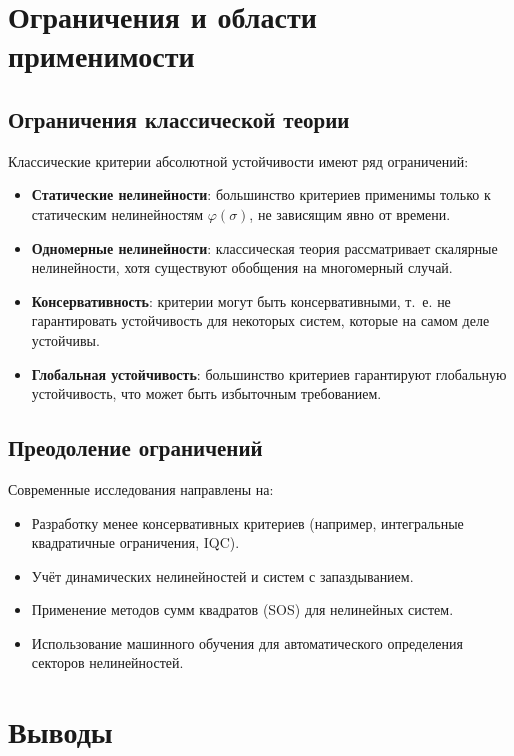 \chapter{Ограничения и области применимости}

\section{Ограничения классической теории}

Классические критерии абсолютной устойчивости имеют ряд ограничений:
\begin{itemize}
    \item \textbf{Статические нелинейности}: большинство критериев применимы только к статическим нелинейностям $\varphi(\sigma)$, не зависящим явно от времени.
    \item \textbf{Одномерные нелинейности}: классическая теория рассматривает скалярные нелинейности, хотя существуют обобщения на многомерный случай.
    \item \textbf{Консервативность}: критерии могут быть консервативными, т.~е. не гарантировать устойчивость для некоторых систем, которые на самом деле устойчивы.
    \item \textbf{Глобальная устойчивость}: большинство критериев гарантируют глобальную устойчивость, что может быть избыточным требованием.
\end{itemize}

\section{Преодоление ограничений}

Современные исследования направлены на:
\begin{itemize}
    \item Разработку менее консервативных критериев (например, интегральные квадратичные ограничения, IQC).
    \item Учёт динамических нелинейностей и систем с запаздыванием.
    \item Применение методов сумм квадратов (SOS) для нелинейных систем.
    \item Использование машинного обучения для автоматического определения секторов нелинейностей.
\end{itemize}

\chapter{Выводы}


